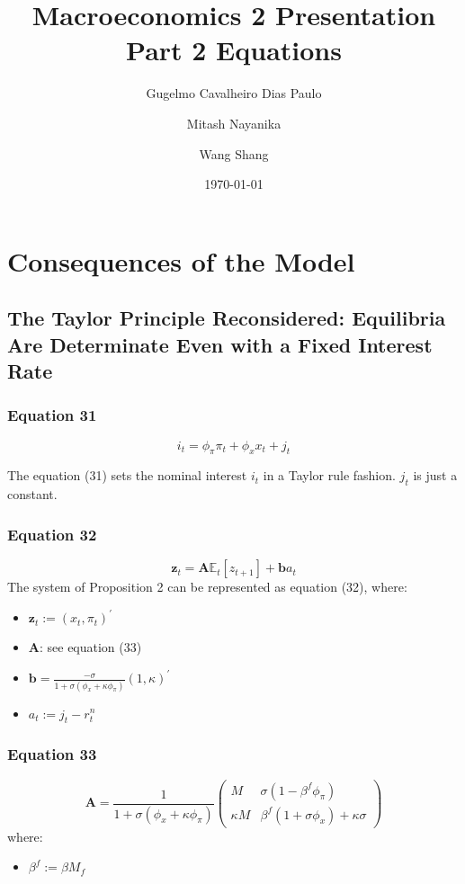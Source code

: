 \documentclass{article}
\title{Macroeconomics 2 Presentation \\ Part 2 Equations}
\author{Gugelmo Cavalheiro Dias Paulo \\ \and Mitash Nayanika \\ \and Wang Shang}
\date{\today}
\begin{document}
\maketitle


\section{Consequences of the Model}

\subsection{The Taylor Principle Reconsidered: Equilibria Are Determinate Even with a Fixed Interest Rate}

\subsubsection*{Equation 31}
\begin{equation}\tag{31}
    i_{t}=\phi_{\pi} \pi_{t}+\phi_{x}x_{t}+j_{t}
\end{equation}

The equation (31) sets the nominal interest $i_{t}$ in a Taylor rule fashion. $j_{t}$ is just a constant.

\subsubsection*{Equation 32}
\begin{equation}\tag{32}
\textbf{z}_{t}=\textbf{A}\mathbb{E}_{t}\left[z_{t+1}\right]+\textbf{b}a_{t}
\end{equation}
The system of Proposition 2 can be represented as equation (32), where:
\begin{itemize}
    \item $\textbf{z}_{t}:=(x_{t},\pi_{t})^{\prime}$
    \item $\textbf{A}$: see equation (33)
    \item $\textbf{b}=\frac{-\sigma}{1+\sigma(\phi_{x}+\kappa\phi_{\pi})}(1,\kappa)^{\prime}$
    \item $a_{t}:=j_{t}-r_{t}^{n}$
\end{itemize}

\subsubsection*{Equation 33}
\begin{equation}\tag{33}
    \textbf{A}=\frac{1}{1+\sigma(\phi_{x}+\kappa\phi_{\pi})}\begin{pmatrix} M & \sigma(1-\beta^{f}\phi_{\pi}) \\ \kappa M & \beta^{f}(1+\sigma\phi_{x})+\kappa\sigma \end{pmatrix}
\end{equation}
where:
\begin{itemize}
    \item $\beta^{f}:=\beta M_{f}$
\end{itemize}
\end{document}
